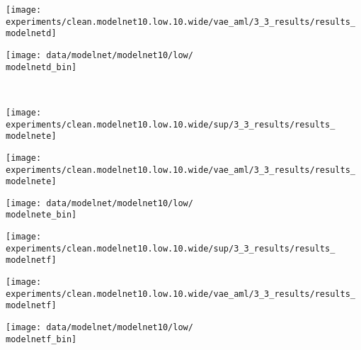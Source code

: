 {\begin{minipage}[t]{0.97\textwidth}
\begin{minipage}[t]{0.145\textwidth}
        \vspace{0px}\centering
        \texttt{[image: experiments/clean.modelnet10.low.10.wide/vae\_aml/3\_3\_results/results\_\\modelnetd]}
    \end{minipage}
    \begin{minipage}[t]{0.145\textwidth}
        \vspace{0px}\centering
        \texttt{[image: data/modelnet/modelnet10/low/\\modelnetd\_bin]}
    \end{minipage}
    \\
    \begin{minipage}[t]{0.145\textwidth}
        \vspace{0px}\centering
        \texttt{[image: experiments/clean.modelnet10.low.10.wide/sup/3\_3\_results/results\_\\modelnete]}
    \end{minipage}
    \begin{minipage}[t]{0.145\textwidth}
        \vspace{0px}\centering
        \texttt{[image: experiments/clean.modelnet10.low.10.wide/vae\_aml/3\_3\_results/results\_\\modelnete]}
    \end{minipage}
    \begin{minipage}[t]{0.145\textwidth}
        \vspace{0px}\centering
        \texttt{[image: data/modelnet/modelnet10/low/\\modelnete\_bin]}
    \end{minipage}
    \hspace*{2.5mm}
    \begin{minipage}[t]{0.145\textwidth}
        \vspace{0px}\centering
        \texttt{[image: experiments/clean.modelnet10.low.10.wide/sup/3\_3\_results/results\_\\modelnetf]}
    \end{minipage}
    \begin{minipage}[t]{0.145\textwidth}
        \vspace{0px}\centering
        \texttt{[image: experiments/clean.modelnet10.low.10.wide/vae\_aml/3\_3\_results/results\_\\modelnetf]}
    \end{minipage}
    \begin{minipage}[t]{0.145\textwidth}
        \vspace{0px}\centering
        \texttt{[image: data/modelnet/modelnet10/low/\\modelnetf\_bin]}
    \end{minipage}
\end{minipage}
}